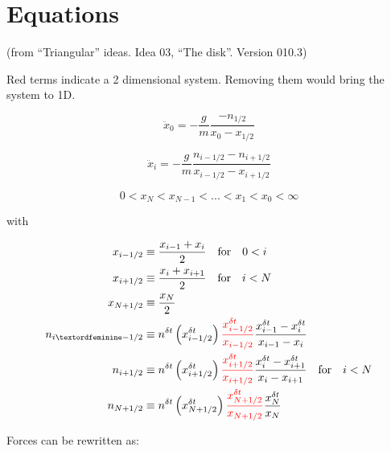 \documentclass{article}
\begin{document}
\section{Equations}
 (from “Triangular” ideas. Idea 03, “The disk”. Version 010.3)

Red terms indicate a 2 dimensional system. Removing them would bring the system to 1D.

$$\ddot{x}_0 =-\frac{g}{m}\frac{-n_{1/2}}{x_{0}-x_{1/2}}$$

$$\ddot{x}_i =-\frac{g}{m}\frac{n_{i-1/2}-n_{i+1/2}}{x_{i-1/2}-x_{i+1/2}}$$

$$0<x_N<x_{N-1}<...<x_1<x_0<\infty $$

with

\begin{equation}
  \begin{split}
    x_{i-1/2} & \equiv \frac{x_{i-1}+x_i}{2} \quad\text{for}\quad 0<i \\
    x_{i+1/2} & \equiv \frac{x_i+x_{i+1}}{2} \quad\text{for}\quad i<N\\
    x_{N+1/2} & \equiv \frac{x_N}{2}\\
    n_{iª-1/2} & \equiv n^{\delta t}\left(x^{\delta t}_{i-1/2}\right)\textcolor{red}{\frac{x^{\delta t}_{i-1/2}}{x_{i-1/2}}}\frac{x^{\delta t}_{i-1}-x^{\delta t}_i}{x_{i-1}-x_i}\\
    n_{i+1/2} & \equiv n^{\delta t}\left(x^{\delta t}_{i+1/2}\right)\textcolor{red}{\frac{x^{\delta t}_{i+1/2}}{x_{i+1/2}}}\frac{x^{\delta t}_i-x^{\delta t}_{i+1}}{x_i-x_{i+1}}\quad\text{for}\quad i<N\\
    n_{N+1/2} & \equiv n^{\delta t}\left(x^{\delta t}_{N+1/2}\right)\textcolor{red}{\frac{x^{\delta t}_{N+1/2}}{x_{N+1/2}}}\frac{x^{\delta t}_N}{x_N}
  \end{split}
\end{equation}



Forces can be rewritten as:
\end{document}
